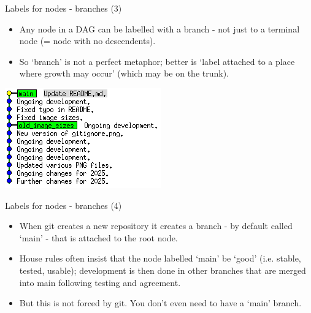 \documentclass[usenames,dvipsnames]{beamer}
\begin{document}
\begin{frame}{Labels for nodes - branches (3)}
  \begin{block}{}
    \begin{itemize}
      \item{Any node in a DAG can be labelled with a branch - not just to a terminal node (= node with no descendents).}
      \item{So `branch' is not a perfect metaphor; better is `label attached to a place where growth may occur' (which may be on the trunk).}
    \end{itemize}
    \begin{center}
      \includegraphics[scale=0.8]{Branch_3.png}
    \end{center}
  \end{block}
\end{frame}

\begin{frame}{Labels for nodes - branches (4)}
  \begin{block}{}
    \begin{itemize}
      \item{When git creates a new repository it creates a branch - by default called `main' - that is attached to the root node.}
      \item{House rules often insist that the node labelled `main' be `good' (i.e. stable, tested, usable); development is then done in other branches that are merged into main following testing and agreement.}
      \item{But this is not forced by git. You don't even need to have a `main' branch.}
    \end{itemize}
  \end{block}
\end{frame}
\end{document}
